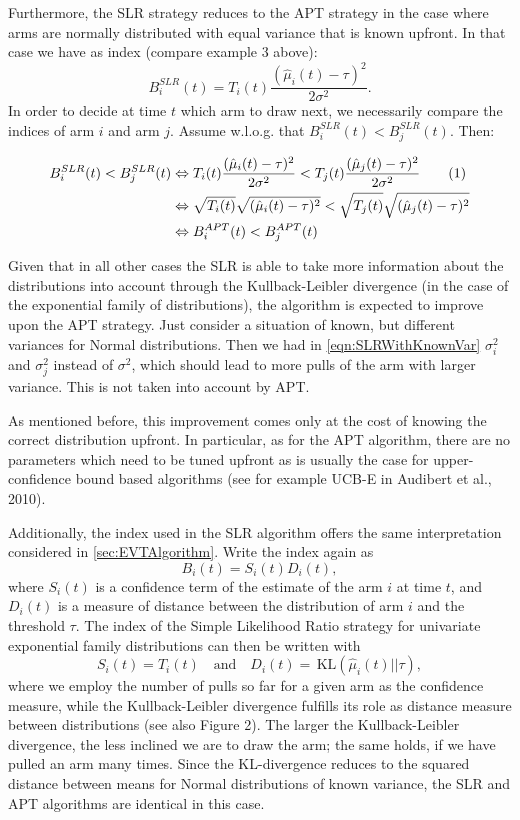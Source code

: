 \documentclass[11pt,]{article}
\newcommand{\KL}{\,\text{KL}}
\newcommand*{\Alignyesnumber}{\refstepcounter{equation}\tag{\theequation}}%
\begin{document}
Furthermore, the SLR strategy reduces to the APT strategy in the case
where arms are normally distributed with equal variance that is known
upfront. In that case we have as index (compare example 3 above): \[
B_i^{SLR}(t) = T_i(t)\frac{(\hat{\mu}_i(t) - \tau)^2}{2\sigma^2}.
\] In order to decide at time \(t\) which arm to draw next, we
necessarily compare the indices of arm \(i\) and arm \(j\). Assume
w.l.o.g. that \(B_i^{SLR}(t) < B_j^{SLR}(t)\). Then:

\begin{align*}
B_i^{SLR}(t) < B_j^{SLR}(t) & \Leftrightarrow 
T_i(t)\frac{(\hat{\mu}_i(t) - \tau)^2}{2\sigma^2} < T_j(t)\frac{(\hat{\mu}_j(t) - \tau)^2}{2\sigma^2} \Alignyesnumber\label{eqn:SLRWithKnownVar}\\
& \Leftrightarrow 
\sqrt{T_i(t)}\sqrt{(\hat{\mu}_i(t) - \tau)^2} < \sqrt{T_j(t)}\sqrt{(\hat{\mu}_j(t) - \tau)^2} \\
& \Leftrightarrow 
B_i^{APT}(t) < B_j^{APT}(t)
\end{align*}

Given that in all other cases the SLR is able to take more information
about the distributions into account through the Kullback-Leibler
divergence (in the case of the exponential family of distributions), the
algorithm is expected to improve upon the APT strategy. Just consider a
situation of known, but different variances for Normal distributions.
Then we had in \autoref{eqn:SLRWithKnownVar} \(\sigma_i^2\) and
\(\sigma_j^2\) instead of \(\sigma^2\), which should lead to more pulls
of the arm with larger variance. This is not taken into account by APT.

As mentioned before, this improvement comes only at the cost of knowing
the correct distribution upfront. In particular, as for the APT
algorithm, there are no parameters which need to be tuned upfront as is
usually the case for upper-confidence bound based algorithms (see for
example UCB-E in Audibert et al., 2010).

Additionally, the index used in the SLR algorithm offers the same
interpretation considered in \autoref{sec:EVTAlgorithm}. Write the index
again as \[
B_i(t) = S_i(t) D_i(t),
\] where \(S_i(t)\) is a confidence term of the estimate of the arm
\(i\) at time \(t\), and \(D_i(t)\) is a measure of distance between the
distribution of arm \(i\) and the threshold \(\tau\). The index of the
Simple Likelihood Ratio strategy for univariate exponential family
distributions can then be written with \[
S_i(t) = T_i(t) \quad \text{and} \quad
D_i(t) = \KL(\hat{\mu}_i(t)||\tau),
\] where we employ the number of pulls so far for a given arm as the
confidence measure, while the Kullback-Leibler divergence fulfills its
role as distance measure between distributions (see also Figure 2). The
larger the Kullback-Leibler divergence, the less inclined we are to draw
the arm; the same holds, if we have pulled an arm many times. Since the
KL-divergence reduces to the squared distance between means for Normal
distributions of known variance, the SLR and APT algorithms are
identical in this case.
\end{document}
